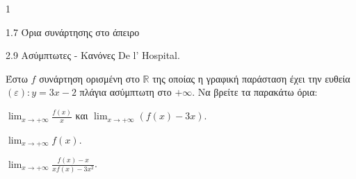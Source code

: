 \begin{ylh}{1}
    \item 1.7 Όρια συνάρτησης στο άπειρο
    \item 2.9 Ασύμπτωτες - Κανόνες De l’ Hospital.
\end{ylh}
Έστω $f$ συνάρτηση ορισμένη στο $\mathbb{R}$ της οποίας η γραφική παράσταση έχει την ευθεία $(\varepsilon): y=3x-2$ πλάγια ασύμπτωτη στο $+\infty$. Να βρείτε τα παρακάτω όρια:
\begin{alist}
\item $\lim_{x\to+\infty} \frac{f(x)}{x}$ και $\lim_{x\to+\infty} (f(x)-3x)$. 
\item $\lim_{x\to+\infty} f(x)$. 
\item $\lim_{x\to+\infty} \frac{f(x)-x}{xf(x)-3x^2}$. 
\end{alist}